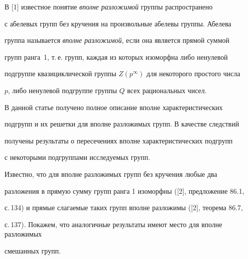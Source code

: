 \date{}




\pagestyle{plain} %







\maketitle


\label{begin}








В [1] известное понятие {\em вполне разложимой} группы распространено


с абелевых групп без кручения на произвольные абелевы группы. Абелева


группа называется {\em вполне разложимой}, если она является прямой суммой


групп ранга~1, т.\,е. групп, каждая из которых изоморфна либо ненулевой


подгруппе квазициклической группы $Z(p^\infty)$ для некоторого простого числа


$p$, либо ненулевой подгруппе группы $Q$ всех рациональных чисел.





В данной статье получено полное описание вполне характеристических


подгрупп и их решетки для вполне разложимых групп. В качестве следствий


получены результаты о пересечениях вполне характеристических подгрупп


с некоторыми подгруппами исследуемых групп.





Известно, что для вполне разложимых групп без кручения любые два


разложения в прямую сумму групп ранга 1 изоморфны ([2], предложение 86.1,


с.\,134) и прямые слагаемые таких групп вполне разложимы ([2], теорема 86.7,


с.\,137). Покажем, что аналогичные результаты имеют место для вполне разложимых


смешанных групп.





